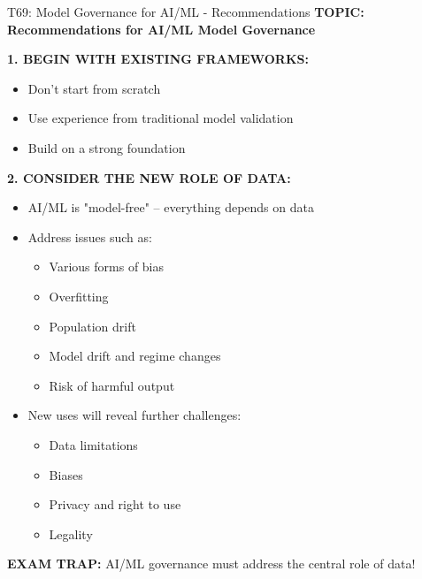 \documentclass[8pt]{beamer}
\begin{document}
	\begin{frame}{T69: Model Governance for AI/ML - Recommendations}
		\fontsize{6.5}{7.5}\selectfont
		\textbf{TOPIC: Recommendations for AI/ML Model Governance}
		
		\vspace{0.1cm}
		\textbf{1. BEGIN WITH EXISTING FRAMEWORKS:}
		\begin{itemize}
			\item Don't start from scratch
			\item Use experience from traditional model validation
			\item Build on a strong foundation
		\end{itemize}
		
		\vspace{0.1cm}
		\textbf{2. CONSIDER THE NEW ROLE OF DATA:}
		\begin{itemize}
			\item AI/ML is "model-free" -- everything depends on data
			\item Address issues such as:
			\begin{itemize}
				\item Various forms of bias
				\item Overfitting
				\item Population drift
				\item Model drift and regime changes
				\item Risk of harmful output
			\end{itemize}
			\item New uses will reveal further challenges:
			\begin{itemize}
				\item Data limitations
				\item Biases
				\item Privacy and right to use
				\item Legality
			\end{itemize}
		\end{itemize}
		
		\textcolor{myred}{\textbf{EXAM TRAP:}} AI/ML governance must \textcolor{myblue}{address the central role of data}!
	\end{frame}
	
\end{document}
